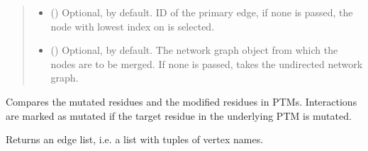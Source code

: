 \documentclass[letterpaper,10pt,english]{sphinxmanual}
\begin{document}
\begin{fulllineitems}
\begin{fulllineitems}
\begin{quote}
\begin{description}
\begin{itemize}
\item {} 
 () \textendash{} Optional,  by default. ID of the primary edge, if
none is passed, the node with lowest index on  is
selected.

\item {} 
 () \textendash{} Optional,  by default. The network graph object from
which the nodes are to be merged. If none is passed, takes
the undirected network graph.

\end{itemize}

\end{description}\end{quote}

\end{fulllineitems}


\begin{fulllineitems}
\label{\detokenize{reference:pypath.main.PyPath.mimp_directions}}
\end{fulllineitems}


\begin{fulllineitems}
\label{\detokenize{reference:pypath.main.PyPath.mutated_edges}}
Compares the mutated residues and the modified residues in PTMs.
Interactions are marked as mutated if the target residue in the
underlying PTM is mutated.

\end{fulllineitems}


\begin{fulllineitems}
\label{\detokenize{reference:pypath.main.PyPath.name_edgelist}}
Returns an edge list, i.e. a list with tuples of vertex names.


\end{fulllineitems}
\end{fulllineitems}
\end{document}
